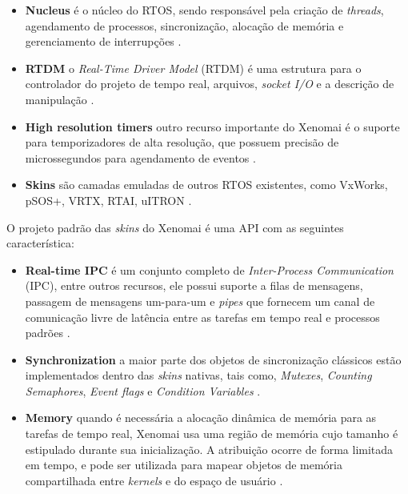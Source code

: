 \documentclass[conference]{IEEEtran}
\begin{document}
\begin{itemize}
	\item \textbf{Nucleus} é o núcleo do RTOS, sendo responsável pela criação de \textit{threads}, agendamento de processos, sincronização, alocação de memória e gerenciamento de interrupções \cite{Silberschatz:2001:OSC:559069}.
	
	\item \textbf{RTDM} o \textit{Real-Time Driver Model} (RTDM) é uma estrutura para o controlador do projeto de tempo real, arquivos, \textit{socket I/O} e a descrição de manipulação \cite{Kiszka}. 
	
	\item \textbf{High resolution timers} outro recurso importante do Xenomai é o suporte para temporizadores de alta resolução, que possuem precisão de microssegundos para agendamento de eventos \cite{Bhaira_linux_xenomai_pcidata}.
	
	\item \textbf{Skins} são camadas emuladas de outros RTOS existentes, como VxWorks, pSOS+, VRTX, RTAI, uITRON \cite{barr2003choosing}.
\end{itemize}

O projeto padrão das \textit{skins} do Xenomai é uma API com as seguintes característica:

\begin{itemize}
	\item \textbf{Real-time IPC} é um conjunto completo de \textit{Inter-Process Communication} (IPC), entre outros recursos, ele possui suporte a filas de mensagens, passagem de mensagens um-para-um e \textit{pipes} que fornecem um canal de comunicação livre de latência entre as tarefas em tempo real e processos padrões \cite{barabanov1997linux}. 
	
	\item \textbf{Synchronization} a maior parte dos objetos de sincronização clássicos estão implementados dentro das \textit{skins} nativas, tais como, \textit{Mutexes}, \textit{Counting Semaphores}, \textit{Event flags} e \textit{Condition Variables} \cite{Silberschatz:2001:OSC:559069}. 
	
	\item \textbf{Memory} quando é necessária a alocação dinâmica de memória para as tarefas de tempo real, Xenomai usa uma região de memória cujo tamanho é estipulado durante sua inicialização. A atribuição ocorre de forma limitada em tempo, e pode ser utilizada para mapear objetos de memória compartilhada entre \textit{kernels} e do espaço de usuário \cite{Xenomai_API}. 
\end{itemize}
\end{document}
